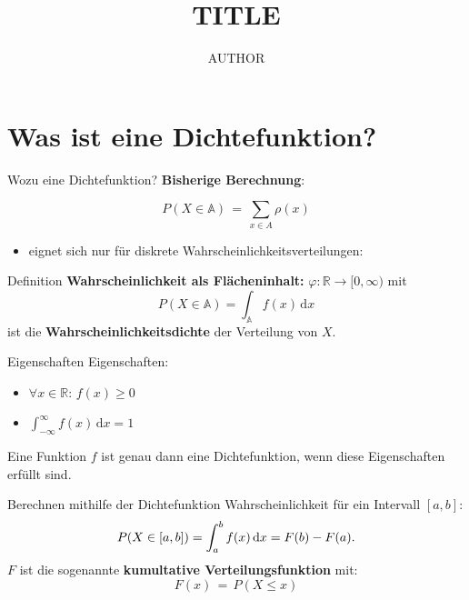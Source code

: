 \documentclass[14pt]{beamer}
\author{AUTHOR}
\title{TITLE}
\institute{Herder Gymnasium Berlin}
\date{}
\begin{document}
\begin{frame}
\titlepage
\end{frame}

\begin{frame}
\tableofcontents
\end{frame}

\section{Was ist eine Dichtefunktion?}
\begin{frame}{Wozu eine Dichtefunktion?}
\textbf{Bisherige Berechnung}:

{\small $$ P(X \in\mathbb{A}) \, = \, \sum_{x\in A} \rho(x) $$}
\begin{itemize}

\item eignet sich nur für diskrete Wahrscheinlichkeitsverteilungen:

\begin{itemize}
\end{itemize}
\end{itemize}

\end{frame}

\begin{frame}{Definition}
\textbf{Wahrscheinlichkeit als Flächeninhalt:}
$\varphi \colon \mathbb{R} \rightarrow [0,\infty)$ mit
$$P(X \in \mathbb{A})=\int_{\mathbb{A}} f(x)\,{\mathrm d}x$$
ist die \textbf{Wahrscheinlichkeitsdichte} der Verteilung von $X$.
\end{frame}

\begin{frame}{Eigenschaften}
Eigenschaften:
\begin{itemize}
\item $\forall x \in \mathbb{R}:\, f(x)\geq 0$
\item $\int_{-\infty}^\infty f(x)\,{\mathrm d}x = 1$
\end{itemize}
Eine Funktion $f$ ist genau dann eine Dichtefunktion, wenn diese Eigenschaften erfüllt sind.
\end{frame}

\begin{frame}{Berechnen mithilfe der Dichtefunktion}
Wahrscheinlichkeit für ein Intervall $[a,b]$:
$$P(X\in [a,b]) = \int_a^b f(x)\, {\rm d}x = F(b)-F(a).$$
$F$ ist die sogenannte \textbf{kumultative Verteilungsfunktion} mit:
$$F(x) \, = \, P(X \le x)$$
\end{frame}
\end{document}
